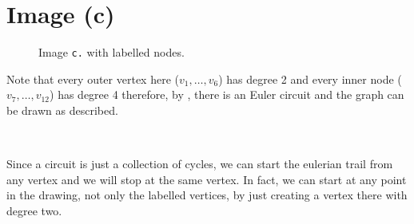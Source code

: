 \section{Image (c)}

\noindent
\begin{minipage}[t]{0.6\textwidth}

    \begin{figure}[H]
        \centering
        

        \caption{Image \texttt{c.} with labelled nodes.}
        \label{fig:graph-c}
    \end{figure}

\end{minipage}%
\begin{minipage}[t]{0.39\textwidth}

    Note that every outer vertex here ($v_1, \ldots, v_6$) has degree 2 and every inner node ($v_7, \ldots, v_{12}$) has degree 4 therefore, by , there is an Euler circuit and the graph can be drawn as described.

    ~

    \indent Since a circuit is just a collection of cycles, we can start the eulerian trail from any vertex and we will stop at the same vertex. In fact, we can start at any point in the drawing, not only the labelled vertices, by just creating a vertex there with degree two.

\end{minipage}
